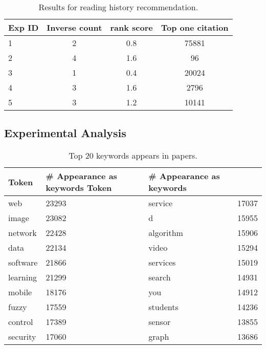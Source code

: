 \begin{table}
	\centering
	\begin{tabular}{lccc}
		\toprule
		\textbf{Exp ID} 	& \textbf{Inverse count} 	& \textbf{rank score} &\textbf{Top one citation}\\ \midrule
		1	& 2	& 0.8		&75881\\
		2	& 4	& 1.6		& 96 \\
		3	& 1	& 0.4		&20024 \\
		4	& 3	& 1.6		&2796\\
		5	& 3	& 1.2		&10141\\
		\bottomrule
	\end{tabular}
	\vspace{3mm}
	\caption{Results for reading history recommendation. }
	\label{res:patternall}
\end{table}


\subsection{Experimental Analysis}

\begin{table}
	\centering
	\begin{tabular}{llll}
		\toprule
		\textbf{Token}		& \textbf{\# Appearance as keywords} \textbf{Token}		& \textbf{\# Appearance as keywords} \\ \midrule
		web	&23293 &service&17037\\
		image &23082&d&15955\\
		network &22428&algorithm&15906\\
		data &22134&video&15294\\
		software &21866 &services&15019\\
		learning &21299&search&14931\\
		mobile &18176&you&14912\\
		fuzzy &17559&students&14236\\
		control &17389&sensor&13855\\
		security & 17060&graph&13686\\
		\bottomrule
	\end{tabular}
	\vspace{3mm}
	\caption{Top 20 keywords appears in papers. }
	\label{res:tfidf}
\end{table}

